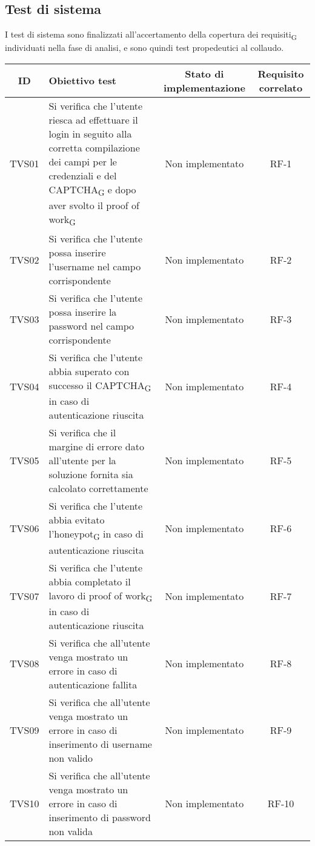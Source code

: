 \subsection{Test di sistema}
I test di sistema sono finalizzati all'accertamento della copertura dei requisiti\textsubscript{G} individuati nella fase di analisi, e sono quindi test propedeutici al collaudo.
\begin{center}
	\setlength\extrarowheight{5pt}
	\begin{xltabular}{\textwidth}{|c|X|c|c|}
		\hline
		\textbf{ID} & \textbf{Obiettivo test} & \textbf{Stato di implementazione} & \textbf{Requisito correlato}\\
		\hline
		TVS01 & Si verifica che l’utente riesca ad effettuare
		il login in seguito alla corretta compilazione dei campi per le credenziali e del CAPTCHA\textsubscript{G} e dopo aver svolto il proof of work\textsubscript{G} & Non implementato & RF-1\\
		\hline
		TVS02 & Si verifica che l'utente possa inserire l'username nel campo corrispondente & Non implementato & RF-2\\
		\hline
		TVS03 & Si verifica che l'utente possa inserire la password nel campo corrispondente & Non implementato & RF-3\\
		\hline
		TVS04 & Si verifica che l'utente abbia superato con successo il CAPTCHA\textsubscript{G} in caso di autenticazione riuscita & Non implementato & RF-4\\
		\hline
		TVS05 & Si verifica che il margine di errore dato all'utente per la soluzione fornita sia calcolato correttamente & Non implementato & RF-5\\
		\hline
		TVS06 & Si verifica che l'utente abbia evitato l'honeypot\textsubscript{G} in caso di  autenticazione riuscita & Non implementato & RF-6\\
		\hline
		TVS07 & Si verifica che l'utente abbia completato il lavoro di proof of work\textsubscript{G} in caso di autenticazione riuscita & Non implementato & RF-7\\
		\hline
		TVS08 & Si verifica che all’utente venga mostrato un errore in caso di autenticazione fallita & Non implementato & RF-8\\
		\hline
		TVS09 & Si verifica che all’utente venga mostrato un errore in caso di inserimento di username non valido & Non implementato & RF-9\\
		\hline
		TVS10 & Si verifica che all’utente venga mostrato un errore in caso di inserimento di password non valida & Non implementato & RF-10\\

\end{xltabular}
\end{center}
